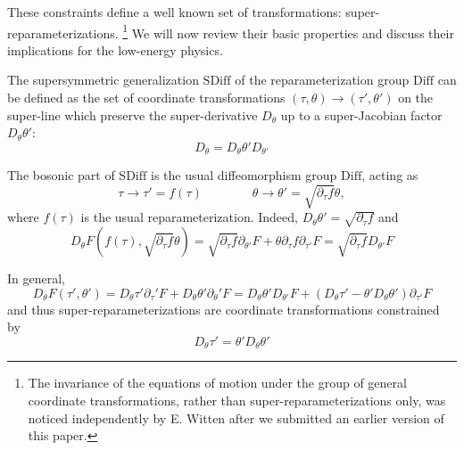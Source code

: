 \documentclass[aps,pre,preprint,onecolumn,citeautoscript,superscriptaddress,nofootinbib,eqsecnum]{revtex4-1}
\begin{document}
These constraints define a well known set of transformations: super-reparameterizations. \footnote{The invariance of the equations of motion 
under the group of general coordinate transformations, rather than super-reparameterizations only, was noticed independently by E. Witten 
after we submitted an earlier version of this paper.} We will now review their basic properties and discuss their implications 
for the low-energy physics. 

The supersymmetric generalization $\mathrm{SDiff}$ of the reparameterization group $\mathrm{Diff}$
can be defined as the set of coordinate transformations $(\tau, \theta) \to (\tau', \theta')$ on the super-line which preserve the super-derivative 
$D_\theta$ up to a super-Jacobian factor $D_\theta \theta'$:
\begin{equation}
D_\theta = D_\theta \theta' D_{\theta'}
\end{equation}

The bosonic part of $\mathrm{SDiff}$ is the usual diffeomorphism group $\mathrm{Diff}$, 
acting as 
\begin{equation}
\tau \to \tau' = f(\tau)  \qquad \qquad \theta \to \theta' = \sqrt{\partial_\tau f} \theta,
\end{equation}
where $f(\tau)$ is the usual reparameterization. Indeed, $D_\theta \theta' = \sqrt{\partial_\tau f}$ and 
\begin{equation}
D_\theta F( f(\tau),\sqrt{\partial_\tau f} \theta ) = \sqrt{\partial_\tau f} \partial_{\theta'} F + \theta \partial_\tau f \partial_{\tau'} F = \sqrt{\partial_\tau f} D_{\theta'} F
\end{equation}

In general, 
\begin{equation}
D_\theta F(\tau',\theta') = D_\theta \tau' \partial_\tau' F + D_\theta \theta' \partial_\theta' F = D_\theta\theta' D_{\theta'} F + \left(D_\theta \tau' - \theta' D_\theta\theta'  \right)\partial_{\tau'} F
\end{equation}
and thus super-reparameterizations are coordinate transformations constrained by 
\begin{equation}
D_\theta \tau' = \theta' D_\theta\theta' 
\end{equation}
\end{document}
